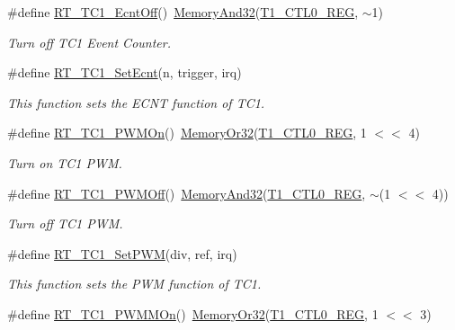 \begin{DoxyCompactItemize}
\#define \mbox{\hyperlink{a00044_a1c9b9839a03d3e9b1158a2be2feebf42}{R\+T\+\_\+\+T\+C1\+\_\+\+Ecnt\+Off}}()~\mbox{\hyperlink{a00020_ad87cedffcaadc51db22594fce55173d4}{Memory\+And32}}(\mbox{\hyperlink{a00020_adadaa0ab1ebbd7ba9b70dfd24c3ed44da38632250c2e72df96fcaa3f8bd8ecc5e}{T1\+\_\+\+C\+T\+L0\+\_\+\+R\+EG}}, $\sim$1)
\begin{DoxyCompactList}\small\item\em Turn off T\+C1 Event Counter. \end{DoxyCompactList}\item 
\#define \mbox{\hyperlink{a00044_a4b786bd70b41c950892beeef4cbd2b27}{R\+T\+\_\+\+T\+C1\+\_\+\+Set\+Ecnt}}(n,  trigger,  irq)
\begin{DoxyCompactList}\small\item\em This function sets the E\+C\+NT function of T\+C1. \end{DoxyCompactList}\item 
\#define \mbox{\hyperlink{a00044_a66b006ccc7fcf8165e1bed013985b92e}{R\+T\+\_\+\+T\+C1\+\_\+\+P\+W\+M\+On}}()~\mbox{\hyperlink{a00020_a27874a97deab7cecdde5ddecf466e31e}{Memory\+Or32}}(\mbox{\hyperlink{a00020_adadaa0ab1ebbd7ba9b70dfd24c3ed44da38632250c2e72df96fcaa3f8bd8ecc5e}{T1\+\_\+\+C\+T\+L0\+\_\+\+R\+EG}}, 1 $<$$<$ 4)
\begin{DoxyCompactList}\small\item\em Turn on T\+C1 P\+WM. \end{DoxyCompactList}\item 
\#define \mbox{\hyperlink{a00044_afbffb90a80851e9a1e6e3dc03938c547}{R\+T\+\_\+\+T\+C1\+\_\+\+P\+W\+M\+Off}}()~\mbox{\hyperlink{a00020_ad87cedffcaadc51db22594fce55173d4}{Memory\+And32}}(\mbox{\hyperlink{a00020_adadaa0ab1ebbd7ba9b70dfd24c3ed44da38632250c2e72df96fcaa3f8bd8ecc5e}{T1\+\_\+\+C\+T\+L0\+\_\+\+R\+EG}}, $\sim$(1 $<$$<$ 4))
\begin{DoxyCompactList}\small\item\em Turn off T\+C1 P\+WM. \end{DoxyCompactList}\item 
\#define \mbox{\hyperlink{a00044_af7f2a1fa7c0f6bf6e61dbc2c1ecb1730}{R\+T\+\_\+\+T\+C1\+\_\+\+Set\+P\+WM}}(div,  ref,  irq)
\begin{DoxyCompactList}\small\item\em This function sets the P\+WM function of T\+C1. \end{DoxyCompactList}\item 
\#define \mbox{\hyperlink{a00044_a6f11e47b5a8e7947fc76e9955e94acea}{R\+T\+\_\+\+T\+C1\+\_\+\+P\+W\+M\+M\+On}}()~\mbox{\hyperlink{a00020_a27874a97deab7cecdde5ddecf466e31e}{Memory\+Or32}}(\mbox{\hyperlink{a00020_adadaa0ab1ebbd7ba9b70dfd24c3ed44da38632250c2e72df96fcaa3f8bd8ecc5e}{T1\+\_\+\+C\+T\+L0\+\_\+\+R\+EG}}, 1 $<$$<$ 3)
$$
\end{DoxyCompactItemize}
